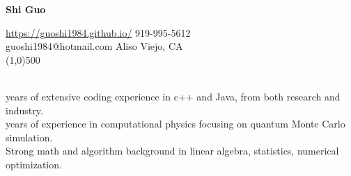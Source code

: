 \documentclass[11pt]{article} %
\begin{document}
 \centerline{\Large \bf Shi Guo}
 \noindent \url{https://guoshi1984.github.io/} \hspace{80mm}  919-995-5612\\
    guoshi1984@hotmail.com \hspace{95mm}   Aliso Viejo, CA\\
\line(1,0){500}


\vspace{4mm}

 \\
 years of extensive coding experience in c++ and Java, from both research and industry.\\
 years of experience in computational physics focusing on quantum Monte Carlo simulation.\\
\noindent Strong math and algorithm background in linear algebra, statistics, numerical optimization.\\



\vspace{0mm}
\end{document}
